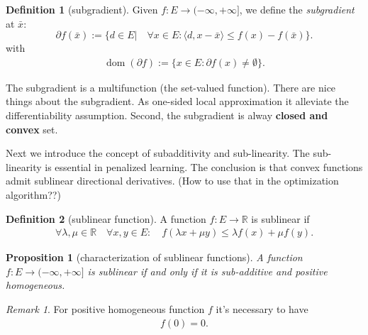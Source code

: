 \documentclass[a4paper,11pt,fleqn, draft]{book}
\newtheorem{proposition}[theorem]{Proposition}
\theoremstyle{definition}
\newtheorem{definition}{Definition}[section]
\theoremstyle{remark}
\newtheorem*{remark}{Remark}
\DeclareMathOperator{\dom}{dom}
\DeclareMathOperator*{\lin}{lin}
\begin{document}
\begin{definition}[subgradient]
	Given $f: E \rightarrow (-\infty, +\infty]$, we define the \textit{subgradient} at $\bar{x}$:
	\begin{equation*}
		\partial f(\bar{x}):= \{ d \in E| \quad \forall x \in E: \langle d, x - \bar{x} \rangle \le f(x) - f(\bar{x})\}.
	\end{equation*}
	with 
	\begin{align*}
		\dom(\partial f):= \{ x \in E: \partial f(x) \neq \emptyset\}. 
	\end{align*}
\end{definition}
The subgradient is a multifunction (the set-valued function). There are nice things about the subgradient. As one-sided local approximation it alleviate the differentiability assumption. Second, the subgradient is alway \textbf{closed and convex} set. 


Next we introduce the concept of subadditivity and sub-linearity. The sub-linearity is essential in penalized learning. The conclusion is that convex functions admit sublinear directional derivatives. (How to use that in the optimization algorithm??)



\begin{definition}[sublinear function]
	A function $f:E \rightarrow \mathbb{R}$ is sublinear if 
	\begin{align*}
		\forall \lambda, \mu \in \mathbb{R} \quad \forall x, y \in E : \quad f(\lambda x + \mu y) \le \lambda f(x) + \mu f(y). 
	\end{align*}
\end{definition}

\begin{proposition}[characterization of sublinear functions]
	A function $f: E \rightarrow (-\infty, +\infty]$ is sublinear if and only if it is sub-additive and positive homogeneous.  
\end{proposition}
\begin{remark}
For positive homogeneous function $f$ it's necessary to have
\begin{align*}
	f(0) = 0. 
\end{align*}	
\end{remark}


\end{document}
